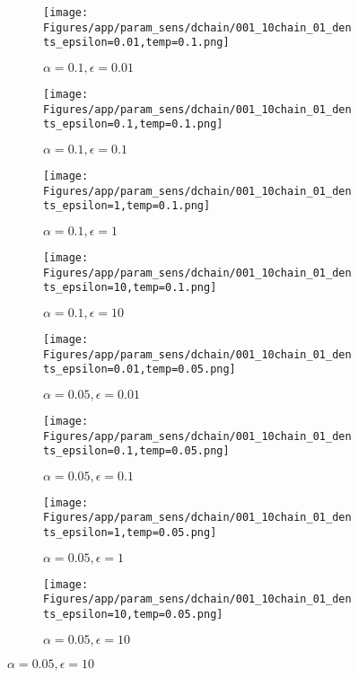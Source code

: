 \documentclass{article}
\theoremstyle{plain}
\begin{document}
\begin{appendices}
\begin{figure}
                \begin{subfigure}[b]{0.24\textwidth}
                    \centering
                    \texttt{[image: Figures/app/param\_sens/dchain/001\_10chain\_01\_dents\_epsilon=0.01,temp=0.1.png]}
                    \caption*{$\alpha=0.1,\epsilon=0.01$}
                \end{subfigure}
                \begin{subfigure}[b]{0.24\textwidth}
                    \centering
                    \texttt{[image: Figures/app/param\_sens/dchain/001\_10chain\_01\_dents\_epsilon=0.1,temp=0.1.png]}
                    \caption*{$\alpha=0.1,\epsilon=0.1$}
                \end{subfigure}
                \begin{subfigure}[b]{0.24\textwidth}
                    \centering
                    \texttt{[image: Figures/app/param\_sens/dchain/001\_10chain\_01\_dents\_epsilon=1,temp=0.1.png]}
                    \caption*{$\alpha=0.1,\epsilon=1$}
                \end{subfigure}
                \begin{subfigure}[b]{0.24\textwidth}
                    \centering
                    \texttt{[image: Figures/app/param\_sens/dchain/001\_10chain\_01\_dents\_epsilon=10,temp=0.1.png]}
                    \caption*{$\alpha=0.1,\epsilon=10$}
                \end{subfigure}
                
                \begin{subfigure}[b]{0.24\textwidth}
                    \centering
                    \texttt{[image: Figures/app/param\_sens/dchain/001\_10chain\_01\_dents\_epsilon=0.01,temp=0.05.png]}
                    \caption*{$\alpha=0.05,\epsilon=0.01$}
                \end{subfigure}
                \begin{subfigure}[b]{0.24\textwidth}
                    \centering
                    \texttt{[image: Figures/app/param\_sens/dchain/001\_10chain\_01\_dents\_epsilon=0.1,temp=0.05.png]}
                    \caption*{$\alpha=0.05,\epsilon=0.1$}
                \end{subfigure}
                \begin{subfigure}[b]{0.24\textwidth}
                    \centering
                    \texttt{[image: Figures/app/param\_sens/dchain/001\_10chain\_01\_dents\_epsilon=1,temp=0.05.png]}
                    \caption*{$\alpha=0.05,\epsilon=1$}
                \end{subfigure}
                \begin{subfigure}[b]{0.24\textwidth}
                    \centering
                    \texttt{[image: Figures/app/param\_sens/dchain/001\_10chain\_01\_dents\_epsilon=10,temp=0.05.png]}
                    \caption*{$\alpha=0.05,\epsilon=10$}
                \end{subfigure}
                

\end{figure}
\end{appendices}
\end{document}
